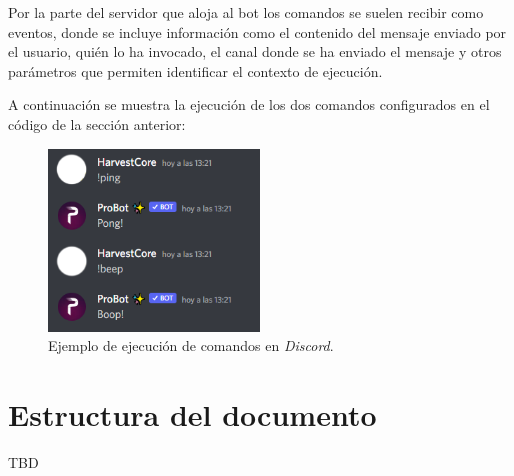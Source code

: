 Por la parte del servidor que aloja al bot los comandos se suelen recibir como eventos, donde se incluye información como el contenido del mensaje enviado por el usuario, quién lo ha invocado, el canal donde se ha enviado el mensaje y otros parámetros que permiten identificar el contexto de ejecución.

A continuación se muestra la ejecución de los dos comandos configurados en el código de la sección anterior:

\begin{figure}[H]
	\centering
	\includegraphics[width=0.5\textwidth]{img/commands.png}
	\caption{Ejemplo de ejecución de comandos en \textit{Discord}.}
\end{figure}



\section{Estructura del documento}

TBD
